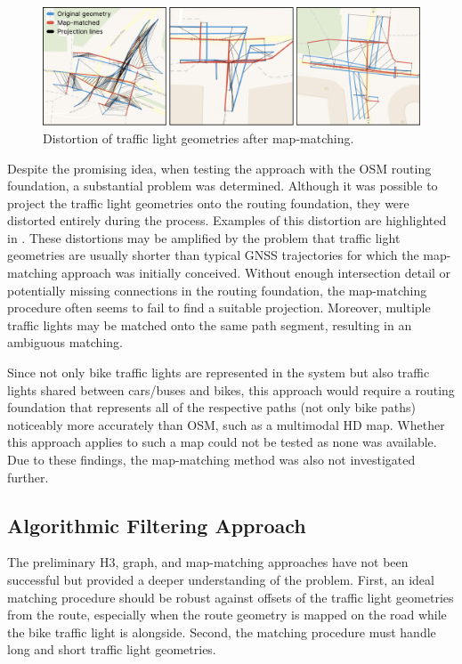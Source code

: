 \begin{figure}[t]
\centering
\includegraphics[width=\linewidth]{images/sg-selection-map-matching-fails.pdf}
\caption{Distortion of traffic light geometries after map-matching.}
\label{fig:sg-selection-map-matching-fails}
\end{figure}

Despite the promising idea, when testing the approach with the OSM routing foundation, a substantial problem was determined. Although it was possible to project the traffic light geometries onto the routing foundation, they were distorted entirely during the process. Examples of this distortion are highlighted in . These distortions may be amplified by the problem that traffic light geometries are usually shorter than typical GNSS trajectories for which the map-matching approach was initially conceived. Without enough intersection detail or potentially missing connections in the routing foundation, the map-matching procedure often seems to fail to find a suitable projection. Moreover, multiple traffic lights may be matched onto the same path segment, resulting in an ambiguous matching. 

Since not only bike traffic lights are represented in the system but also traffic lights shared between cars/buses and bikes, this approach would require a routing foundation that represents all of the respective paths (not only bike paths) noticeably more accurately than OSM, such as a multimodal HD map. Whether this approach applies to such a map could not be tested as none was available. Due to these findings, the map-matching method was also not investigated further.

\subsection{Algorithmic Filtering Approach}

The preliminary H3, graph, and map-matching approaches have not been successful but provided a deeper understanding of the problem. First, an ideal matching procedure should be robust against offsets of the traffic light geometries from the route, especially when the route geometry is mapped on the road while the bike traffic light is alongside. Second, the matching procedure must handle long and short traffic light geometries.

